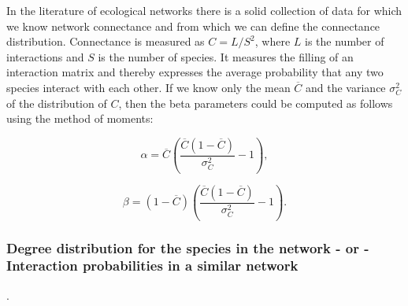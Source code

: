 \documentclass[12pt]{article}
\begin{document}
          In the literature of ecological networks there is a solid collection of data for which we know network connectance and from which we can define the connectance distribution. Connectance is measured as $C = L/S^2$, where $L$ is the number of interactions and $S$ is the number of species. It measures the filling of an interaction matrix and thereby expresses the average probability that any two species interact with each other. If we know only the mean $\overline{C}$ and the variance $\sigma_C^2$ of the distribution of $C$,
          then the beta parameters could be computed as follows using the method of moments:

          \begin{equation}
          \alpha = \overline{C}(\frac{\overline{C}(1-\overline{C})}{\sigma_C^2}-1) ,
          \end{equation}

          \begin{equation}
          \beta = (1-\overline{C})(\frac{\overline{C}(1-\overline{C})}{\sigma_C^2}-1) .
          \end{equation}
    


      \subsubsection*{Degree distribution for the species in the network - or - Interaction probabilities in a similar network}.

\end{document}
